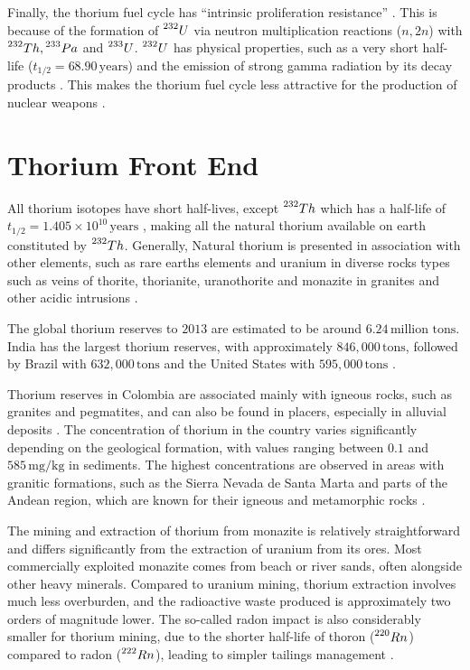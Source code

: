 Finally, the thorium fuel cycle has ``intrinsic proliferation resistance'' \cite{IAEA_Th_Potential}. This is because of the formation of \(\prescript{232}{}{U}\) via neutron multiplication reactions (\(n,2n\)) with \(\prescript{232}{}{Th}, \prescript{233}{}{Pa}\) and \(\prescript{233}{}{U}\). \(\prescript{232}{}{U}\) has physical properties, such as a very short half-life (\(t_{1/2} = 68.90 \, \text{years} \)) and the emission of strong gamma radiation by its decay products \cite{IAEA_Th_Potential,NNDC}. This makes the thorium fuel cycle less attractive for the production of nuclear weapons \cite{IAEA_Th_Potential}.

\section{Thorium Front End}

All thorium isotopes have short half-lives, except \(\prescript{232}{}{Th}\) which has a half-life of \(t_{1/2} = 1.405 \times 10^{10} \, \text{years}\) \cite{NNDC}, making all the natural thorium available on earth constituted by \(\prescript{232}{}{Th}\). Generally, Natural thorium is presented in association with other elements, such as rare earths elements and uranium in diverse rocks types such as veins of thorite, thorianite, uranothorite and  monazite in granites and other acidic intrusions \cite{IAEA_Th_Potential}. 

The global thorium reserves to \(2013\) are estimated to be around \(6.24 \, \text{million tons}\). India has the largest thorium reserves, with approximately \(846,000 \, \text{tons}\), followed by Brazil with \(632,000 \, \text{tons}\) and the United States with \(595,000 \, \text{tons}\) \cite{Th_cycle_viability}.

Thorium reserves in Colombia are associated mainly with igneous rocks, such as granites and pegmatites, and can also be found in placers, especially in alluvial deposits \cite{Th_Colombia}. The concentration of thorium in the country varies significantly depending on the geological formation, with values ranging between \(0.1\) and \(585 \, \text{mg}/\text{kg}\) in sediments. The highest concentrations are observed in areas with granitic formations, such as the Sierra Nevada de Santa Marta and parts of the Andean region, which are known for their igneous and metamorphic rocks \cite{Th_Colombia}. 

The mining and extraction of thorium from monazite is relatively straightforward and differs significantly from the extraction of uranium from its ores. Most commercially exploited monazite comes from beach or river sands, often alongside other heavy minerals. Compared to uranium mining, thorium extraction involves much less overburden, and the radioactive waste produced is approximately two orders of magnitude lower. The so-called radon impact is also considerably smaller for thorium mining, due to the shorter half-life of thoron (\(\prescript{220}{}{Rn}\)) compared to radon (\(\prescript{222}{}{Rn}\)), leading to simpler tailings management \cite{IAEA_Th_Potential,Thoron}.

